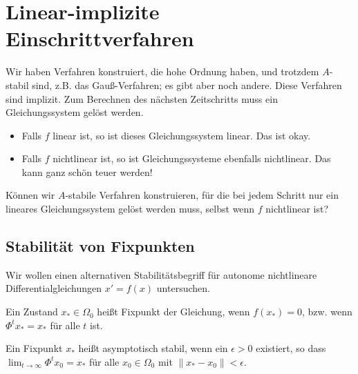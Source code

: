 \documentclass[german]{scrreprt}
\newcommand{\norm}[1]{\lVert #1 \rVert}
\theoremstyle{plain}
\theoremstyle{nonumberplain}
\theoremstyle{nonumberplain}
\theoremstyle{nonumberplain}
\begin{document}

\renewcommand*\contentsname{\huge \centering Optimierung \& Numerik --- Vorlesung 10}
\tableofcontents


\setcounter{chapter}{11}
\setcounter{section}{6}
\setcounter{satz}{15}
\setcounter{lemma}{13}
\setcounter{equation}{3}

\section{Linear-implizite Einschrittverfahren}

Wir haben Verfahren konstruiert, die hohe Ordnung haben, und trotzdem $A$-stabil sind, z.B. das Gauß-Verfahren; es gibt aber noch andere.
Diese Verfahren sind implizit. Zum Berechnen des nächsten Zeitschritts muss ein Gleichungssystem gelöst werden.
\begin{itemize}
	\item Falls $f$ linear ist, so ist dieses Gleichungssystem linear. Das ist okay.
	\item Falls $f$ nichtlinear ist, so ist Gleichungssysteme ebenfalls nichtlinear. Das kann ganz schön teuer werden!
\end{itemize}
Können wir $A$-stabile Verfahren konstruieren, für die bei jedem Schritt nur ein lineares Gleichungssystem gelöst werden muss, selbst wenn $f$ nichtlinear ist?

\subsection{Stabilität von Fixpunkten}

Wir wollen einen alternativen Stabilitätsbegriff für autonome
nichtlineare Differentialgleichungen $x'=f(x)$ untersuchen.

\begin{definition}
	Ein Zustand $x_* \in \Omega_0$ heißt Fixpunkt der Gleichung, wenn $f(x_*)=0$, bzw. wenn $\Phi^tx_* = x_*$ für alle $t$ ist.
\end{definition}
\begin{definition}
	Ein Fixpunkt $x_*$ heißt asymptotisch stabil, wenn ein $\epsilon>0$ existiert, so dass $\lim_{t \to \infty} \Phi^t x_0 = x_*$ für alle $x_0 \in \Omega_0$ mit $\norm{x_* - x_0} < \epsilon$.
\end{definition}
\end{document}
